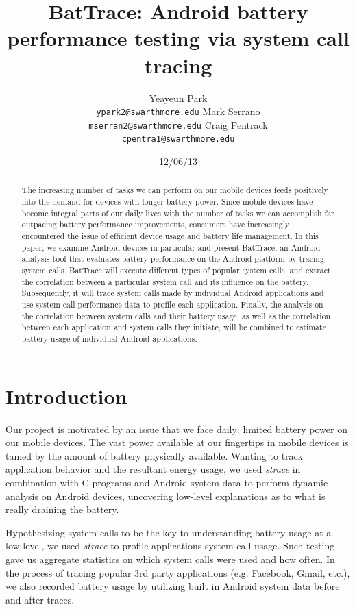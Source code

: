 \documentclass[11pt]{article}
\title{BatTrace: Android battery performance testing via system call tracing}
\author{Yeayeun Park\\
{\tt ypark2@swarthmore.edu}
\And 
Mark Serrano\\
{\tt mserran2@swarthmore.edu}
\AND
Craig Pentrack\\                 
{\tt cpentra1@swarthmore.edu}}
\date{12/06/13}
\begin{document}
\maketitle
\begin{abstract}
  The increasing number of tasks we can perform on our mobile devices 
  feeds positively into the demand for devices with longer battery power. 
  Since mobile devices have become integral parts of our daily lives with
  the number of tasks we can accomplish far outpacing battery performance 
  improvements, consumers have increasingly encountered the issue of 
  efficient device usage and battery life management. In this paper, we 
  examine Android devices in particular and present BatTrace, an Android 
  analysis tool that evaluates battery performance on the Android platform
  by tracing system calls. BatTrace will execute different types of popular system
  calls, and extract the correlation between a particular system call and its 
  influence on the battery. Subsequently, it will trace system calls made by 
  individual Android applications and use system call performance data to profile
  each application. Finally, the analysis on the correlation between system calls and their 
  battery usage, as well as the correlation between each application and system 
  calls they initiate, will be combined to estimate battery usage 
  of individual Android applications.
\end{abstract}

\section{Introduction}
Our project is motivated by an issue that we face daily: limited battery power 
on our mobile devices. The vast power available at our fingertips in mobile
devices is tamed by the amount of battery physically available. Wanting to track application behavior 
and the resultant energy usage, we used \textit{strace} in combination with C programs and Android system data to perform 
dynamic analysis on Android devices, uncovering low-level explanations as to what is really 
draining the battery.

Hypothesizing system calls to be the key to understanding battery usage at a low-level, we 
used \textit{strace} to profile applications system call usage.  Such testing gave us aggregate
statistics on which system calls were used and how often.  In the process of tracing popular
3rd party applications (e.g. Facebook, Gmail, etc.), we also recorded battery usage by utilizing
built in Android system data before and after traces.  
\end{document}
